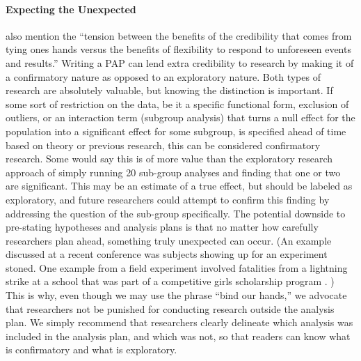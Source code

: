 \documentclass[12pt] {article}
\begin{document}
\paragraph{Expecting the Unexpected}
\cite{glennerster_running_2013} also mention the ``tension between
the benefits of the credibility that comes from tying ones hands versus
the benefits of flexibility to respond to unforeseen events and
results.'' Writing a PAP can lend extra credibility to research by making it of a confirmatory nature as opposed to an exploratory nature.
Both types of research are absolutely valuable, but knowing the distinction is important. If some sort of restriction on the data, be it a specific functional form, exclusion of outliers, or an interaction term (subgroup analysis) that turns a null effect for the population into a significant effect for some subgroup, is specified ahead of time based on theory or previous research, this can be considered confirmatory research. Some would say this is of more value than the exploratory research approach of simply running 20 sub-group analyses and finding that one or two are significant. This may be an estimate of a true effect, but should be labeled as exploratory, and future researchers could attempt to confirm this finding by addressing the question of the sub-group specifically. The potential downside to pre-stating hypotheses and analysis plans is that no matter how carefully researchers plan ahead, something truly unexpected can occur. (An example discussed at a recent conference was subjects showing up for an experiment stoned. One example from a field experiment involved fatalities from a lightning strike at a school that was part of a competitive girls scholarship program \citep{kremer2009incentives}. ) This is why, even though we may use the phrase ``bind our hands,'' we advocate that researchers not be punished for conducting research outside the analysis plan. We simply recommend that researchers clearly delineate which analysis was included in the analysis plan, and which was not, so that readers can know what is confirmatory and what is exploratory.
\end{document}
